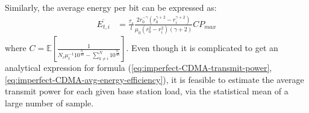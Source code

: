 Similarly, the average energy per bit can be expressed as:
\begin{align}
\overline{E_{t,i}}
& = \frac{\tau_s}{l}\frac{2r_0^{-\gamma}(r_0^{\gamma+2}-r_i^{\gamma+2})}{\mu_0(r_0^2-r_i^2)(\gamma+2)}CP_{max}  \label{eq:imperfect-CDMA-avg-energy-efficiency}
\end{align}
where $C = \mathbb{E}\left[ \frac{1}{N_{c}\mu_{t}^{-1}10^{\frac{\eta_i}{10}} -\sum_{k \neq i}^{\overline{N}}10^{\frac{\eta_k}{10}}}\right]$.
Even though it is complicated to get an analytical expression for formula (\ref{eq:imperfect-CDMA-transmit-power},\ref{eq:imperfect-CDMA-avg-energy-efficiency}), it is feasible to estimate the average transmit power for each given base station load, via the statistical mean of a large number of sample.


